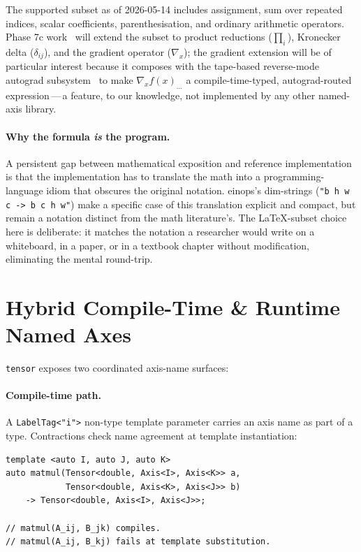 \documentclass[11pt,a4paper]{article}
\begin{document}
The supported subset as of 2026-05-14 includes assignment, sum
over repeated indices, scalar coefficients, parenthesisation, and
ordinary arithmetic operators. Phase 7c work~\cite{tensorRoadmap2026}
will extend the subset to product reductions ($\prod_i$),
Kronecker delta ($\delta_{ij}$), and the gradient operator
($\nabla_x$); the gradient extension will be of particular
interest because it composes with the tape-based reverse-mode
autograd subsystem~\cite{tensorADR0007} to make
$\nabla_x f(x)_{\dots}$ a compile-time-typed, autograd-routed
expression\,---\,a feature, to our knowledge, not implemented by
any other named-axis library.

\paragraph{Why the formula \emph{is} the program.} A persistent
gap between mathematical exposition and reference implementation
is that the implementation has to translate the math into a
programming-language idiom that obscures the original notation.
einops's dim-strings (\verb|"b h w c -> b c h w"|) make a
specific case of this translation explicit and compact, but
remain a notation distinct from the math literature's. The
\LaTeX-subset choice here is deliberate: it matches the
notation a researcher would write on a whiteboard, in a paper,
or in a textbook chapter without modification, eliminating the
mental round-trip.

\section{Hybrid Compile-Time \& Runtime Named Axes}
\label{sec:hybrid-axes}

\texttt{tensor} exposes two coordinated axis-name surfaces:

\paragraph{Compile-time path.} A \texttt{LabelTag<"i">}
non-type template parameter carries an axis name as part of a
type. Contractions check name agreement at template
instantiation:

\begin{lstlisting}
template <auto I, auto J, auto K>
auto matmul(Tensor<double, Axis<I>, Axis<K>> a,
            Tensor<double, Axis<K>, Axis<J>> b)
    -> Tensor<double, Axis<I>, Axis<J>>;

// matmul(A_ij, B_jk) compiles.
// matmul(A_ij, B_kj) fails at template substitution.
\end{lstlisting}
\end{document}
